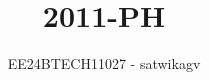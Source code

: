 \documentclass[journal]{IEEEtran}
\begin{document}

\vspace{3cm}

\title{2011-PH}
\author{EE24BTECH11027 - satwikagv}
{\let\newpage\relax\maketitle}

\renewcommand{\thefigure}{\theenumi}
\renewcommand{\thetable}{\theenumi}
\setlength{\intextsep}{10pt} %


\renewcommand{\thetable}{\theenumi}
\end{document}
